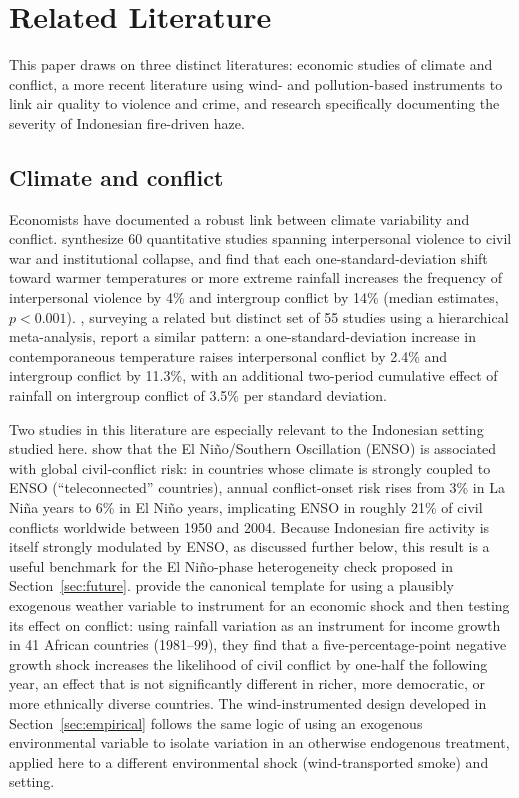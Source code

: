 \documentclass[12pt]{article}
\begin{document}
\section{Related Literature}
\label{sec:litreview}

This paper draws on three distinct literatures: economic studies of climate and conflict, a more recent literature using wind- and pollution-based instruments to link air quality to violence and crime, and research specifically documenting the severity of Indonesian fire-driven haze.

\subsection{Climate and conflict}

Economists have documented a robust link between climate variability and conflict. \citet{hsiang2013quantifying} synthesize 60 quantitative studies spanning interpersonal violence to civil war and institutional collapse, and find that each one-standard-deviation shift toward warmer temperatures or more extreme rainfall increases the frequency of interpersonal violence by 4\% and intergroup conflict by 14\% (median estimates, $p<0.001$). \citet{burkehsiangmiguel2015}, surveying a related but distinct set of 55 studies using a hierarchical meta-analysis, report a similar pattern: a one-standard-deviation increase in contemporaneous temperature raises interpersonal conflict by 2.4\% and intergroup conflict by 11.3\%, with an additional two-period cumulative effect of rainfall on intergroup conflict of 3.5\% per standard deviation.

Two studies in this literature are especially relevant to the Indonesian setting studied here. \citet{hsiangmengcane2011} show that the El Ni\~{n}o/Southern Oscillation (ENSO) is associated with global civil-conflict risk: in countries whose climate is strongly coupled to ENSO (``teleconnected'' countries), annual conflict-onset risk rises from 3\% in La Ni\~{n}a years to 6\% in El Ni\~{n}o years, implicating ENSO in roughly 21\% of civil conflicts worldwide between 1950 and 2004. Because Indonesian fire activity is itself strongly modulated by ENSO, as discussed further below, this result is a useful benchmark for the El Ni\~{n}o-phase heterogeneity check proposed in Section~\ref{sec:future}. \citet{miguelsatyanathsergenti2004} provide the canonical template for using a plausibly exogenous weather variable to instrument for an economic shock and then testing its effect on conflict: using rainfall variation as an instrument for income growth in 41 African countries (1981--99), they find that a five-percentage-point negative growth shock increases the likelihood of civil conflict by one-half the following year, an effect that is not significantly different in richer, more democratic, or more ethnically diverse countries. The wind-instrumented design developed in Section~\ref{sec:empirical} follows the same logic of using an exogenous environmental variable to isolate variation in an otherwise endogenous treatment, applied here to a different environmental shock (wind-transported smoke) and setting.
\end{document}
